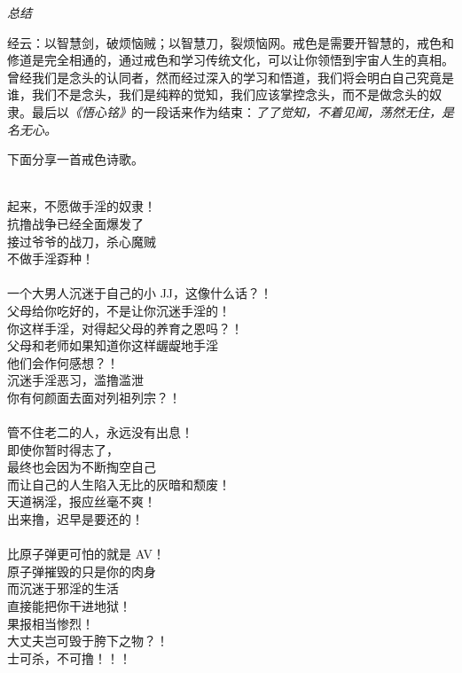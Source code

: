 \textit{总结}

经云：以智慧剑，破烦恼贼；以智慧刀，裂烦恼网。戒色是需要开智慧的，戒色和修道是完全相通的，通过戒色和学习传统文化，可以让你领悟到宇宙人生的真相。曾经我们是念头的认同者，然而经过深入的学习和悟道，我们将会明白自己究竟是谁，我们不是念头，我们是纯粹的觉知，我们应该掌控念头，而不是做念头的奴隶。最后以\textit{《悟心铭》}的一段话来作为结束：\textit{了了觉知，不着见闻，荡然无住，是名无心。}

下面分享一首戒色诗歌。

\begin{adjustwidth}{-1em}{-1em}
    \begin{poem}[抗撸战争]
        \begin{multicols}{2}
            \centering~\\
            起来，不愿做手淫的奴隶！ \\ 抗撸战争已经全面爆发了 \\ 接过爷爷的战刀，杀心魔贼 \\ 不做手淫孬种！\\~\\
            一个大男人沉迷于自己的小 JJ，这像什么话？！ \\ 父母给你吃好的，不是让你沉迷手淫的！ \\ 你这样手淫，对得起父母的养育之恩吗？！ \\ 父母和老师如果知道你这样龌龊地手淫 \\ 他们会作何感想？！ \\ 沉迷手淫恶习，滥撸滥泄 \\ 你有何颜面去面对列祖列宗？！\\~\\
            管不住老二的人，永远没有出息！ \\ 即使你暂时得志了， \\ 最终也会因为不断掏空自己 \\ 而让自己的人生陷入无比的灰暗和颓废！ \\ 天道祸淫，报应丝毫不爽！\\ 出来撸，迟早是要还的！\\~\\
            比原子弹更可怕的就是 AV！ \\ 原子弹摧毁的只是你的肉身 \\ 而沉迷于邪淫的生活 \\ 直接能把你干进地狱！ \\ 果报相当惨烈！ \\ 大丈夫岂可毁于胯下之物？！ \\ 士可杀，不可撸！！！\\~\\

\end{multicols}
\end{poem}
\end{adjustwidth}
